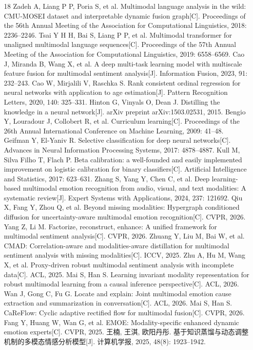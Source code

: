 \documentclass[withoutpreface,bwprint]{cumcmthesis}
\begin{document}
\begin{thebibliography}{18}
 Zadeh A, Liang P P, Poria S, et al. Multimodal language analysis in the wild: CMU-MOSEI dataset and interpretable dynamic fusion graph[C]. Proceedings of the 56th Annual Meeting of the Association for Computational Linguistics, 2018: 2236--2246.
 Tsai Y H H, Bai S, Liang P P, et al. Multimodal transformer for unaligned multimodal language sequences[C]. Proceedings of the 57th Annual Meeting of the Association for Computational Linguistics, 2019: 6558--6569.
 Cao J, Miranda B, Wang X, et al. A deep multi-task learning model with multiscale feature fusion for multimodal sentiment analysis[J]. Information Fusion, 2023, 91: 232--243.
 Cao W, Mirjalili V, Raschka S. Rank consistent ordinal regression for neural networks with application to age estimation[J]. Pattern Recognition Letters, 2020, 140: 325--331.
 Hinton G, Vinyals O, Dean J. Distilling the knowledge in a neural network[J]. arXiv preprint arXiv:1503.02531, 2015.
 Bengio Y, Louradour J, Collobert R, et al. Curriculum learning[C]. Proceedings of the 26th Annual International Conference on Machine Learning, 2009: 41--48.
 Geifman Y, El-Yaniv R. Selective classification for deep neural networks[C]. Advances in Neural Information Processing Systems, 2017: 4878--4887.
 Kull M, Silva Filho T, Flach P. Beta calibration: a well-founded and easily implemented improvement on logistic calibration for binary classifiers[C]. Artificial Intelligence and Statistics, 2017: 623--631.
 Zhang S, Yang Y, Chen C, et al. Deep learning-based multimodal emotion recognition from audio, visual, and text modalities: A systematic review[J]. Expert Systems with Applications, 2024, 237: 121692.
 Qiu X, Fang Y, Zhou Q, et al. Beyond missing modalities: Hypergraph conditioned diffusion for uncertainty-aware multimodal emotion recognition[C]. CVPR, 2026.
 Yang Z, Li M. Factorize, reconstruct, enhance: A unified framework for multimodal sentiment analysis[C]. CVPR, 2026.
 Zhuang Y, Liu M, Bai W, et al. CMAD: Correlation-aware and modalities-aware distillation for multimodal sentiment analysis with missing modalities[C]. ICCV, 2025.
 Zhu A, Hu M, Wang X, et al. Proxy-driven robust multimodal sentiment analysis with incomplete data[C]. ACL, 2025.
 Mai S, Han S. Learning invariant modality representation for robust multimodal learning from a causal inference perspective[C]. ACL, 2026.
 Wan J, Gong C, Fu G. Locate and explain: Joint multimodal emotion cause extraction and summarization in conversation[C]. ACL, 2026.
 Mai S, Han S. CaReFlow: Cyclic adaptive rectified flow for multimodal fusion[C]. CVPR, 2026.
 Fang Y, Huang W, Wan G, et al. EMOE: Modality-specific enhanced dynamic emotion experts[C]. CVPR, 2025.
 王楠, 王淇, 欧阳丹彤. 基于知识蒸馏与动态调整机制的多模态情感分析模型[J]. 计算机学报, 2025, 48(8): 1923--1942.
\end{thebibliography}
\end{document}
